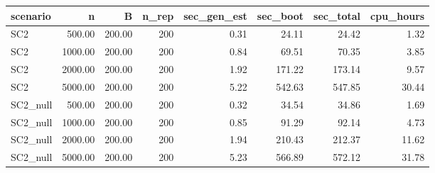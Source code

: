 \begin{tabular}{lrrrrrrr}
  \hline
scenario & n & B & n\_rep & sec\_gen\_est & sec\_boot & sec\_total & cpu\_hours \\ 
  \hline
SC2 & 500.00 & 200.00 & 200 & 0.31 & 24.11 & 24.42 & 1.32 \\ 
  SC2 & 1000.00 & 200.00 & 200 & 0.84 & 69.51 & 70.35 & 3.85 \\ 
  SC2 & 2000.00 & 200.00 & 200 & 1.92 & 171.22 & 173.14 & 9.57 \\ 
  SC2 & 5000.00 & 200.00 & 200 & 5.22 & 542.63 & 547.85 & 30.44 \\ 
  SC2\_null & 500.00 & 200.00 & 200 & 0.32 & 34.54 & 34.86 & 1.69 \\ 
  SC2\_null & 1000.00 & 200.00 & 200 & 0.85 & 91.29 & 92.14 & 4.73 \\ 
  SC2\_null & 2000.00 & 200.00 & 200 & 1.94 & 210.43 & 212.37 & 11.62 \\ 
  SC2\_null & 5000.00 & 200.00 & 200 & 5.23 & 566.89 & 572.12 & 31.78 \\ 
   \hline
\end{tabular}
